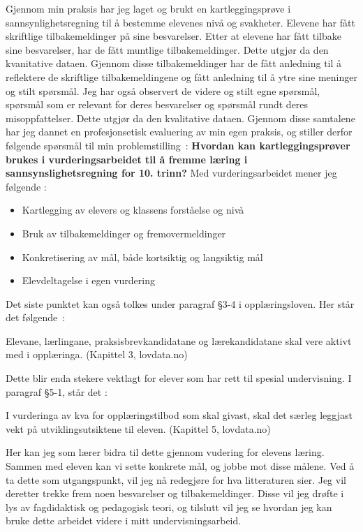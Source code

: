 \documentclass[main.tex]{subfiles}
\begin{document}
Gjennom min praksis har jeg laget og brukt en kartleggingsprøve i sannsynlighetsregning til å bestemme
elevenes nivå og svakheter. Elevene har fått skriftlige tilbakemeldinger på sine besvarelser.
Etter at elevene har fått tilbake sine besvarelser, har de fått muntlige tilbakemeldinger. Dette utgjør da 
den kvanitative dataen. Gjennom disse tilbakemeldinger har de fått anledning til å reflektere
de skriftlige tilbakemeldingene og fått anledning til å ytre sine meninger og stilt spørsmål. Jeg har også
observert de videre og stilt egne spørsmål, spørsmål som er relevant for deres besvarelser og spørsmål
rundt deres misoppfattelser. Dette utgjør da den kvalitative dataen. Gjennom disse samtalene har jeg dannet 
en profesjonsetisk evaluering av min egen praksis, og stiller derfor følgende spørsmål til min 
\mbox{problemstilling :}
\newline
\newline
\textbf{Hvordan kan kartleggingsprøver brukes i vurderingsarbeidet til å fremme læring i 
        sannsynslighetsregning for 10. trinn?}
\newline
\newline
Med vurderingsarbeidet mener jeg følgende :
\begin{itemize}
\item Kartlegging av elevers og klassens forståelse og nivå
\item Bruk av tilbakemeldinger og fremovermeldinger
\item Konkretisering av mål, både kortsiktig og langsiktig mål
\item Elevdeltagelse i egen vurdering
\end{itemize}
Det siste punktet kan også tolkes under paragraf \S 3-4 i opplæringsloven. Her står det \mbox{følgende :}
\begin{displayquote}
Elevane, lærlingane, praksisbrevkandidatane og lærekandidatane skal vere aktivt med i opplæringa.
(Kapittel 3, lovdata.no)
\end{displayquote}
Dette blir enda stekere vektlagt for elever som har rett til spesial undervisning. I paragraf \S 5-1, står det :
\begin{displayquote}
I vurderinga av kva for opplæringstilbod som skal givast, skal det særleg leggjast vekt på utviklingsutsiktene til eleven.
(Kapittel 5, lovdata.no)
\end{displayquote}
Her kan jeg som lærer bidra til dette gjennom vudering for elevens læring. Sammen med eleven kan vi sette konkrete mål,
og jobbe mot disse målene. Ved å ta dette som utgangspunkt, vil jeg nå redegjøre for hva litteraturen sier.
Jeg vil deretter trekke frem noen besvarelser og tilbakemeldinger. Disse vil jeg drøfte i lys av fagdidaktisk og 
pedagogisk teori, og tilslutt vil jeg se hvordan jeg kan bruke dette arbeidet videre i mitt undervisningsarbeid.
\end{document}
